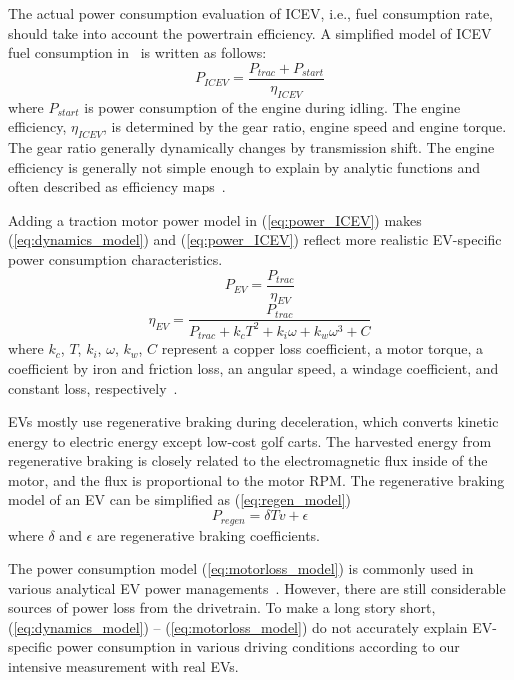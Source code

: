 \documentclass{IEEEtran}
\begin{document}
The actual power consumption evaluation of ICEV, i.e., fuel consumption rate, should take into account the powertrain efficiency. A simplified model of ICEV fuel consumption in~\cite{Kamal:TITS11} is written as follows:
%
\begin{equation} \label{eq:power_ICEV} %
P_{ICEV} = \frac{P_{trac} + P_{start}}{\eta_{ICEV}} 
\end{equation}
where $P_{start}$ is power consumption of the engine during idling. The engine efficiency, $\eta_{ICEV}$, is determined by the gear ratio, engine speed and engine torque. The gear ratio generally dynamically changes by transmission shift. The engine efficiency is generally not simple enough to explain by analytic functions and often described as efficiency maps~\cite{Kamal:TITS11}.

Adding a traction motor power model in (\ref{eq:power_ICEV}) makes (\ref{eq:dynamics_model}) and (\ref{eq:power_ICEV}) reflect more realistic EV-specific power consumption characteristics. 
%
\begin{equation} \label{eq:motorloss_model} %
P_{EV} = \frac{P_{trac}}{\eta_{EV}}
\end{equation}
\begin{equation}
\eta_{EV} = \frac{P_{trac}}{{P_{trac} + k_c T^2 + k_i \omega + k_w \omega^3 + C}}\nonumber 
\end{equation}
where $k_c$, $T$, $k_i$, $\omega$, $k_w$, $C$ represent a copper loss coefficient, a motor torque, a coefficient by iron and friction loss, an angular speed, a windage coefficient, and constant loss, respectively~\cite{Hong:ASPDAC16}.

EVs mostly use regenerative braking during deceleration, which converts kinetic energy to electric energy except low-cost golf carts. The harvested energy from regenerative braking is closely related to the electromagnetic flux inside of the motor, and the flux is proportional to the motor RPM. The regenerative braking model of an EV can be  simplified as (\ref{eq:regen_model}) 
%
\begin{equation}\label{eq:regen_model} 
P_{regen} = \delta T v + \epsilon 
\end{equation}  %
%
where $\delta$ and $\epsilon$ are regenerative braking coefficients.

The power consumption model (\ref{eq:motorloss_model}) is commonly used in various analytical EV power managements~\cite{Dib:IVPPC11, Dib:CEP14, Wu:TR15}. However, there are still considerable sources of power loss from  the drivetrain. To make a long story short, (\ref{eq:dynamics_model}) -- (\ref{eq:motorloss_model}) do not accurately explain EV-specific power consumption in various driving conditions according to our intensive measurement with real EVs. 
\end{document}
